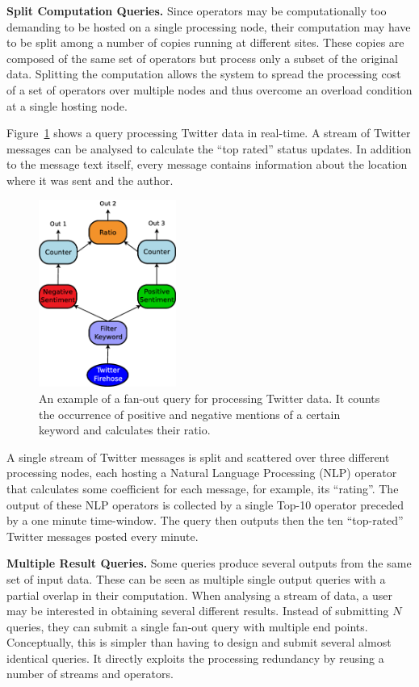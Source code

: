 \textbf{Split Computation Queries.} 
Since operators may be computationally too demanding to be hosted on a single processing node, their
computation may have to be split among a number of copies running at different sites. These
copies are composed of the same set of operators but process only a subset of the original data.
Splitting the computation allows the system to spread the processing cost of a set of operators over
multiple nodes and thus overcome an overload condition at a single hosting node. 

\ex Figure~\ref{fig:query_fanout} shows a query processing Twitter data in
real-time. A stream of Twitter messages can be analysed to calculate the ``top rated'' status updates.
In addition to the message text itself, every message contains information about the location where it
was sent and the author.
\begin{figure}[b!]
	\centering
	\includegraphics[width=0.4\textwidth]{img/tesi/fan-out_2_senza} 
	\caption{An example of a fan-out query for processing Twitter data. It counts the occurrence of positive
	and negative mentions of a certain keyword and calculates their ratio.}
	\label{fig:query_fanout}
\end{figure}
A single stream of Twitter messages is split and scattered over three different processing nodes, each
hosting a Natural Language Processing (NLP) operator that calculates some coefficient for each message,
for example, its ``rating''. The output of these NLP operators is collected by a single Top-10
operator preceded by a one minute time-window. The query then outputs then the ten ``top-rated'' Twitter
messages posted every minute. 

\textbf{Multiple Result Queries.} Some queries produce several outputs from the same set of
input data.
These can be seen as multiple single output queries with a partial overlap in their computation. When analysing a
stream of data, a user may be interested in obtaining several different results. Instead of submitting
$N$ queries, they can submit a single fan-out query with multiple end points. Conceptually, this is
simpler than having to design and submit several almost identical queries. It directly exploits the
processing redundancy by reusing a number of streams and operators.


